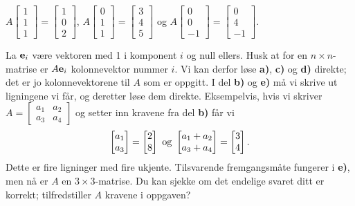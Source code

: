 \begin{oppgave}
\begin{punkt}
$A \begin{bmatrix}
1\\
1\\
1
\end{bmatrix}
 =  \begin{bmatrix}
1\\
0\\
2
\end{bmatrix} 
 $, $A \begin{bmatrix}
0\\
1\\
1
\end{bmatrix}
 =  \begin{bmatrix}
3\\
4\\
5
\end{bmatrix} 
$ \newline 
og $A \begin{bmatrix}
0\\
0\\
-1
\end{bmatrix}
 =  \begin{bmatrix}
0\\
4\\
-1
\end{bmatrix}.
 $
\end{punkt}
\end{oppgave}




\begin{losning}
La $\mathbf{e}_i$ være vektoren med 1 i komponent $i$ og null ellers. Husk at for en $n\times n$-matrise er $A\mathbf{e}_i$ kolonnevektor nummer $i$. Vi kan derfor løse \textbf{a)}, \textbf{c)} og \textbf{d)} direkte; det er jo kolonnevektorene til $A$ som er oppgitt. I del \textbf{b)} og \textbf{e)} må vi skrive ut ligningene vi får, og deretter løse dem direkte. Eksempelvis, hvis vi skriver $A=\begin{bmatrix}
a_1 & a_2\\
a_3 & a_4
\end{bmatrix}
$ og setter inn kravene fra del \textbf{b)} får vi $$\begin{bmatrix} a_1 \\ a_3 \end{bmatrix}=\begin{bmatrix} 2 \\ 8 \end{bmatrix} \text{ og } \begin{bmatrix} a_1+a_2 \\ a_3+a_4 \end{bmatrix}=\begin{bmatrix} 3 \\ 4 \end{bmatrix}.$$ Dette er fire ligninger med fire ukjente. Tilsvarende fremgangsmåte fungerer i \textbf{e)}, men nå er $A$ en $3\times 3$-matrise. Du kan sjekke om det endelige svaret ditt er korrekt; tilfredstiller $A$ kravene i oppgaven?
\end{losning}




